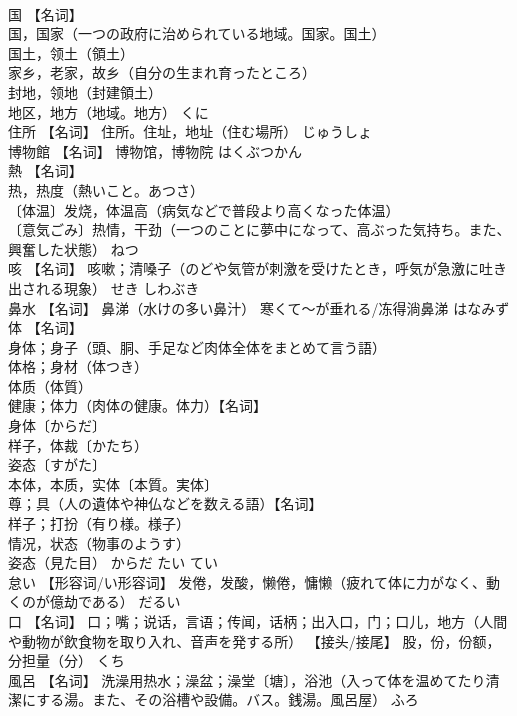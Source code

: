 \documentclass[8pt]{extreport}
\begin{document}
\begin{CJK}{UTF8}{min}
\\	国	【名词】 
\\	国，国家（一つの政府に治められている地域。国家。国土） 
\\	国土，领土（領土） 
\\	家乡，老家，故乡（自分の生まれ育ったところ） 
\\	封地，领地（封建領土） 
\\	地区，地方（地域。地方）	くに	
\\	住所	【名词】 住所。住址，地址（住む場所）	じゅうしょ	
\\	博物館	【名词】 博物馆，博物院	はくぶつかん	
\\	熱	【名词】 
\\	热，热度（熱いこと。あつさ） 
\\	〔体温〕发烧，体温高（病気などで普段より高くなった体温） 
\\	〔意気ごみ〕热情，干劲（一つのことに夢中になって、高ぶった気持ち。また、興奮した状態）	ねつ	
\\	咳	【名词】 咳嗽；清嗓子（のどや気管が刺激を受けたとき，呼気が急激に吐き出される現象）	せき しわぶき	
\\	鼻水	【名词】 鼻涕（水けの多い鼻汁） 寒くて～が垂れる/冻得淌鼻涕	はなみず	
\\	体	【名词】 
\\	身体；身子（頭、胴、手足など肉体全体をまとめて言う語） 
\\	体格；身材（体つき） 
\\	体质（体質） 
\\	健康；体力（肉体の健康。体力）【名词】 
\\	身体〔からだ〕 
\\	样子，体裁〔かたち） 
\\	姿态〔すがた〕 
\\	本体，本质，实体〔本質。実体〕 
\\	尊；具（人の遺体や神仏などを数える語）【名词】 
\\	样子；打扮（有り様。様子） 
\\	情况，状态（物事のようす） 
\\	姿态（見た目）	からだ たい てい	
\\	怠い	【形容词/い形容词】 发倦，发酸，懒倦，慵懒（疲れて体に力がなく、動くのが億劫である）	だるい	
\\	口	【名词】 口；嘴；说话，言语；传闻，话柄；出入口，门；口儿，地方（人間や動物が飲食物を取り入れ、音声を発する所） 【接头/接尾】 股，份，份额，分担量（分）	くち	
\\	風呂	【名词】 洗澡用热水；澡盆；澡堂〔塘〕，浴池（入って体を温めてたり清潔にする湯。また、その浴槽や設備。バス。銭湯。風呂屋）	ふろ	

\end{CJK}
\end{document}
